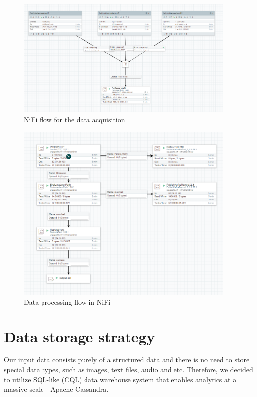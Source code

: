 \documentclass[12pt,a4paper, hidelinks]{article}
\begin{document}
\begin{figure}[h!]
    \centering
    \includegraphics[width=0.95\textwidth]{images/m2-nifi-1.png}
    \caption{NiFi flow for the data acquisition}
    \label{fig:nifi1}
\end{figure}
\begin{figure}[h!]
    \centering
    \includegraphics[width=0.95\textwidth]{images/m2-nifi-2.png}
    \caption{Data processing flow in NiFi}
    \label{fig:nifi2}
\end{figure}
\section{Data storage strategy}

Our input data consists purely of a structured data and there is no need to store special data types, such as images, text files, audio and etc. Therefore, we decided to utilize SQL-like (CQL) data warehouse system that enables analytics at a massive scale - Apache Cassandra.
\end{document}
